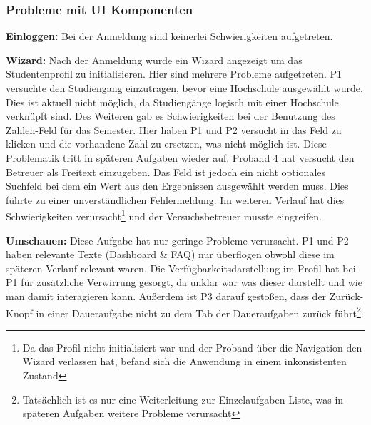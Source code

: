 \documentclass[
  12pt,
  ngerman,
  a4paper,
]{article}
\begin{document}
\hypertarget{probleme-mit-ui-komponenten}{%
\subsubsection{Probleme mit UI
Komponenten}\label{probleme-mit-ui-komponenten}}

\textbf{Einloggen:} Bei der Anmeldung sind keinerlei Schwierigkeiten
aufgetreten.

\textbf{Wizard:} Nach der Anmeldung wurde ein Wizard angezeigt um das
Studentenprofil zu initialisieren. Hier sind mehrere Probleme
aufgetreten. P1 versuchte den Studiengang einzutragen, bevor eine
Hochschule ausgewählt wurde. Dies ist aktuell nicht möglich, da
Studiengänge logisch mit einer Hochschule verknüpft sind. Des Weiteren
gab es Schwierigkeiten bei der Benutzung des Zahlen-Feld für das
Semester. Hier haben P1 und P2 versucht in das Feld zu klicken und die
vorhandene Zahl zu ersetzen, was nicht möglich ist. Diese Problematik
tritt in späteren Aufgaben wieder auf. Proband 4 hat versucht den
Betreuer als Freitext einzugeben. Das Feld ist jedoch ein nicht
optionales Suchfeld bei dem ein Wert aus den Ergebnissen ausgewählt
werden muss. Dies führte zu einer unverständlichen Fehlermeldung. Im
weiteren Verlauf hat dies Schwierigkeiten verursacht\footnote{Da das
  Profil nicht initialisiert war und der Proband über die Navigation den
  Wizard verlassen hat, befand sich die Anwendung in einem
  inkonsistenten Zustand} und der Versuchsbetreuer musste eingreifen.

\textbf{Umschauen:} Diese Aufgabe hat nur geringe Probleme verursacht.
P1 und P2 haben relevante Texte (Dashboard \& FAQ) nur überflogen obwohl
diese im späteren Verlauf relevant waren. Die Verfügbarkeitsdarstellung
im Profil hat bei P1 für zusätzliche Verwirrung gesorgt, da unklar war
was dieser darstellt und wie man damit interagieren kann. Außerdem ist
P3 darauf gestoßen, dass der Zurück-Knopf in einer Daueraufgabe nicht zu
dem Tab der Daueraufgaben zurück führt\footnote{Tatsächlich ist es nur
  eine Weiterleitung zur Einzelaufgaben-Liste, was in späteren Aufgaben
  weitere Probleme verursacht}.
\end{document}
